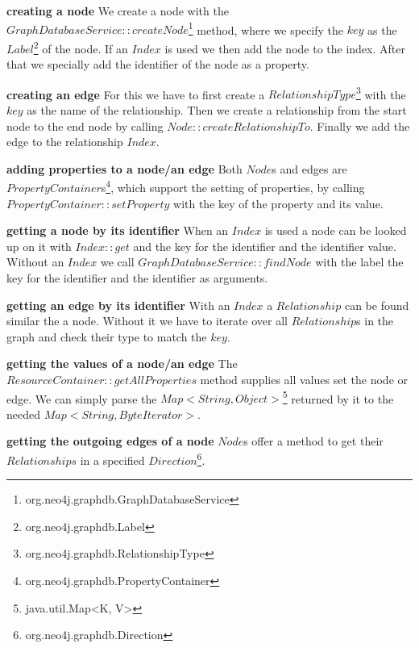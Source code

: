 \textbf{creating a node} \newline
We create a node with the $ GraphDatabaseService::createNode $\footnote{org.neo4j.graphdb.GraphDatabaseService} method,
where we specify the $ key $ as the $ Label $\footnote{org.neo4j.graphdb.Label} of the node.
If an $ Index $ is used we then add the node to the index.
After that we specially add the identifier of the node as a property.

\textbf{creating an edge} \newline
For this we have to first create a $ RelationshipType $\footnote{org.neo4j.graphdb.RelationshipType} with the $ key $ as the name of the relationship.
Then we create a relationship from the start node to the end node by calling $ Node::createRelationshipTo $.
Finally we add the edge to the relationship $ Index $.

\textbf{adding properties to a node/an edge} \newline
Both $ Node $s and edges are $ PropertyContainer $s\footnote{org.neo4j.graphdb.PropertyContainer},
which support the setting of properties,
by calling $ PropertyContainer::setProperty $ with the key of the property and its value.

\textbf{getting a node by its identifier} \newline
When an $ Index $ is used a node can be looked up on it with $ Index::get $ and the key for the identifier and the identifier value.
Without an $ Index $ we call \linebreak
$ GraphDatabaseService::findNode $ with the label the key for the identifier and the identifier as arguments.

\textbf{getting an edge by its identifier} \newline
With an $ Index $ a $ Relationship $ can be found similar the a node.
Without it we have to iterate over all $ Relationship $s in the graph and check their type to match the $ key $.

\textbf{getting the values of a node/an edge} \newline
The $ ResourceContainer::getAllProperties $ method supplies all values set the node or edge.
We can simply parse the $ Map<String, Object> $\footnote{java.util.Map<K, V>} returned by it to the needed $ Map<String, ByteIterator> $.

\textbf{getting the outgoing edges of a node} \newline
$ Node $s offer a method to get their $ Relationships $ in a specified $ Direction $\footnote{org.neo4j.graphdb.Direction}.

